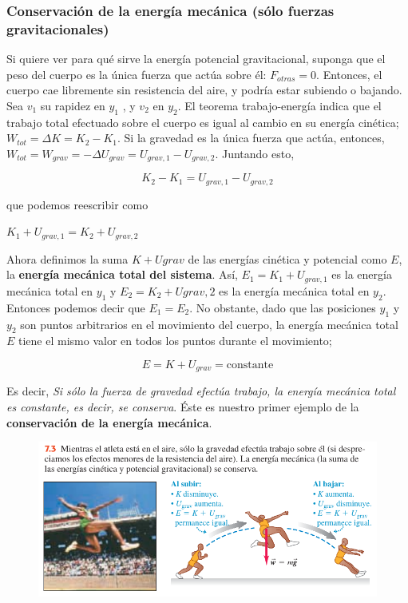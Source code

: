 \documentclass{article}
\newcommand{\newtitle}[1]{
    \color{titleColor}
    \subsubsection{\textbf{#1}}
    \color{black}
}
\newcommand{\bl}[1]{\textbf{#1}}
\newcommand{\definicion}[1]{%
    \vspace{0.5cm}
    \begin{definicionbox}
        #1
    \end{definicionbox}
    \vspace{0.5cm}
}
\begin{document}
    \newtitle{Conservación de la energía mecánica (sólo fuerzas gravitacionales)}

    \par Si quiere ver para qué sirve la energía potencial gravitacional, suponga que el peso del cuerpo es la única fuerza que actúa sobre él: $F_{otras} = 0$. Entonces, el cuerpo cae libremente sin resistencia del aire, y podría estar subiendo o bajando. Sea $v_1$ su rapidez en $y_1$ , y $v_2$ en $y_2$. El teorema trabajo-energía indica que el trabajo total efectuado sobre el cuerpo es igual al cambio en su energía cinética; $W_{tot} = \Delta K = K_2 - K_1$. Si la gravedad es la única fuerza que actúa, entonces, $W_{tot} = W_{grav} = -\Delta U_{grav} = U_{grav,1} - U_{grav,2}$. Juntando esto,

    \[ K_2 - K_1 = U_{grav,1} - U_{grav,2} \]

    \noindent que podemos reescribir como

    \definicion{
        \centering
        $ K_1 + U_{grav,1} = K_2 + U_{grav,2} $
    }

    \par Ahora deﬁnimos la suma $K + U{grav}$ de las energías cinética y potencial como $E$, la \bl{energía mecánica total del sistema}. Así, $E_1 = K_1 + U_{grav,1}$ es la energía mecánica total en $y_1$ y $E_2 = K_2 + Ugrav,2$ es la energía mecánica total en $y_2$. Entonces podemos decir que $E_1 = E_2$. No obstante, dado que las posiciones $y_1$ y $y_2$ son puntos arbitrarios en el movimiento del cuerpo, la energía mecánica total $E$ tiene el mismo valor en todos los puntos durante el movimiento;

    \[ E = K + U_{grav} = \text{constante} \]

    \par Es decir, \textit{Si sólo la fuerza de gravedad efectúa trabajo, la energía mecánica total es constante, es decir, se conserva}. Éste es nuestro primer ejemplo de la \bl{conservación de la energía mecánica}.

    \begin{figure}[H]
        \centering
        \includegraphics[scale=0.7]{img/6.1-2.png}
    \end{figure}
\end{document}
